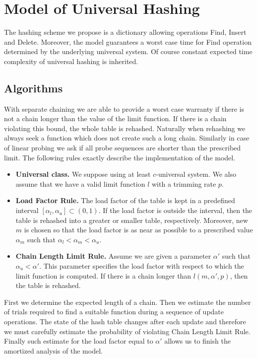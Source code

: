 \section{Model of Universal Hashing}
\label{section-model}
The hashing scheme we propose is a dictionary allowing operations Find, Insert and Delete. Moreover, the model guarantees a worst case time for Find operation determined by the underlying universal system. Of course constant expected time complexity of universal hashing is inherited. 

\subsection{Algorithms}
With separate chaining we are able to provide a worst case warranty if there is not a chain longer than the value of the limit function. If there is a chain violating this bound, the whole table is rehashed. Naturally when rehashing we always seek a function which does not create such a long chain. Similarly in case of linear probing we ask if all probe sequences are shorter than the prescribed limit. The following rules exactly describe the implementation of the model.
\begin{itemize}
\item \textbf{Universal class.} We suppose using at least $c$-universal system. We also assume that we have a valid limit function $l$ with a trimming rate $p$.

\item \textbf{Load Factor Rule.} The load factor of the table is kept in a predefined interval $[\alpha_l, \alpha_u] \subset (0, 1)$. If the load factor is outside the interval, then the table is rehashed into a greater or smaller table, respectively. Moreover, new $m$ is chosen so that the load factor is as near as possible to a prescribed value $\alpha_m$ such that $\alpha_l < \alpha_m < \alpha_u$. 

\item \textbf{Chain Length Limit Rule.} Assume we are given a parameter $\alpha'$ such that $\alpha_u < \alpha'$. This parameter specifies the load factor with respect to which the limit function is computed. If there is a chain longer than $l(m, \alpha', p)$, then the table is rehashed.
\end{itemize}

First we determine the expected length of a chain. Then we estimate the number of trials required to find a suitable function during a sequence of update operations. The state of the hash table changes after each update and therefore we must carefully estimate the probability of violating Chain Length Limit Rule. Finally such estimate for the load factor equal to $\alpha'$ allows us to finish the amortized analysis of the model.


